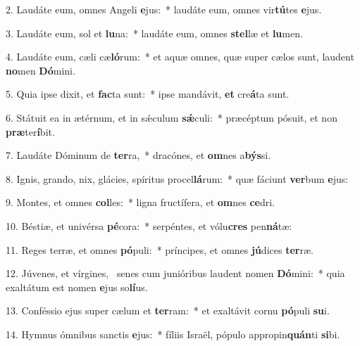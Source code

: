 2. Laudáte eum, omnes Angeli \textbf{e}jus:~*  laudáte eum, omnes vir\textbf{tú}tes \textbf{e}jus.\

3. Laudáte eum, sol et \textbf{lu}na:~*  laudáte eum, omnes \textbf{stel}læ et \textbf{lu}men.\

4. Laudáte eum, cæli cæ\textbf{ló}rum:~*  et aquæ omnes, quæ super cælos sunt, laudent \textbf{no}men \textbf{Dó}mini.\

5. Quia ipse dixit, et \textbf{fac}ta sunt:~*  ipse mandávit, \textbf{et} cre\textbf{á}ta sunt.\

6. Státuit ea in ætérnum, et in sǽculum \textbf{sǽ}culi:~*  præcéptum pósuit, et non \textbf{præ}ter\textbf{í}bit.\

7. Laudáte Dóminum de \textbf{ter}ra,~*  dracónes, et \textbf{om}nes a\textbf{býs}si.\

8. Ignis, grando, nix, glácies, spíritus procel\textbf{lá}rum:~*  quæ fáciunt \textbf{ver}bum \textbf{e}jus:\

9. Montes, et omnes \textbf{col}les:~*  ligna fructífera, et \textbf{om}nes \textbf{ce}dri.\

10. Béstiæ, et univérsa \textbf{pé}cora:~*  serpéntes, et vólu\textbf{cres} pen\textbf{ná}tæ:\

11. Reges terræ, et omnes \textbf{pó}puli:~*  príncipes, et omnes \textbf{jú}dices \textbf{ter}ræ.\

12. Júvenes, et vírgines, \dag\  senes cum junióribus laudent nomen \textbf{Dó}mini:~*  quia exaltátum est nomen \textbf{e}jus so\textbf{lí}us.\

13. Conféssio ejus super cælum et \textbf{ter}ram:~*  et exaltávit cornu \textbf{pó}puli \textbf{su}i.\

14. Hymnus ómnibus sanctis \textbf{e}jus:~*  fíliis Israël, pópulo appropin\textbf{quán}ti \textbf{si}bi.\

